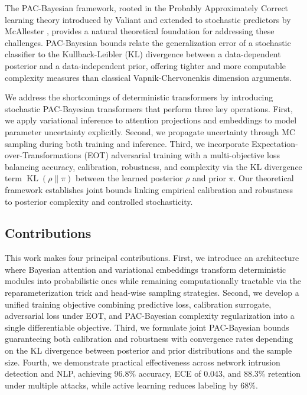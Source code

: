 \documentclass[12pt,a4paper]{article}
\theoremstyle{definition}
\DeclareMathOperator{\KL}{KL}
\begin{document}
The PAC-Bayesian framework, rooted in the Probably Approximately Correct learning theory introduced by Valiant \citep{valiant1984theory} and extended to stochastic predictors by McAllester \citep{mcallester1998some,mcallester2003pac}, provides a natural theoretical foundation for addressing these challenges. PAC-Bayesian bounds relate the generalization error of a stochastic classifier to the Kullback-Leibler (KL) divergence between a data-dependent posterior and a data-independent prior, offering tighter and more computable complexity measures than classical Vapnik-Chervonenkis dimension arguments.

We address the shortcomings of deterministic transformers by introducing stochastic PAC-Bayesian transformers that perform three key operations. First, we apply variational inference to attention projections and embeddings to model parameter uncertainty explicitly. Second, we propagate uncertainty through MC sampling during both training and inference. Third, we incorporate Expectation-over-Transformations (EOT) adversarial training with a multi-objective loss balancing accuracy, calibration, robustness, and complexity via the KL divergence term $\KL(\rho\|\pi)$ between the learned posterior $\rho$ and prior $\pi$. Our theoretical framework establishes joint bounds linking empirical calibration and robustness to posterior complexity and controlled stochasticity.

\subsection{Contributions}

This work makes four principal contributions. First, we introduce an architecture where Bayesian attention and variational embeddings transform deterministic modules into probabilistic ones while remaining computationally tractable via the reparameterization trick and head-wise sampling strategies. Second, we develop a unified training objective combining predictive loss, calibration surrogate, adversarial loss under EOT, and PAC-Bayesian complexity regularization into a single differentiable objective. Third, we formulate joint PAC-Bayesian bounds guaranteeing both calibration and robustness with convergence rates depending on the KL divergence between posterior and prior distributions and the sample size. Fourth, we demonstrate practical effectiveness across network intrusion detection and NLP, achieving 96.8\% accuracy, ECE of 0.043, and 88.3\% retention under multiple attacks, while active learning reduces labeling by 68\%.
\end{document}

